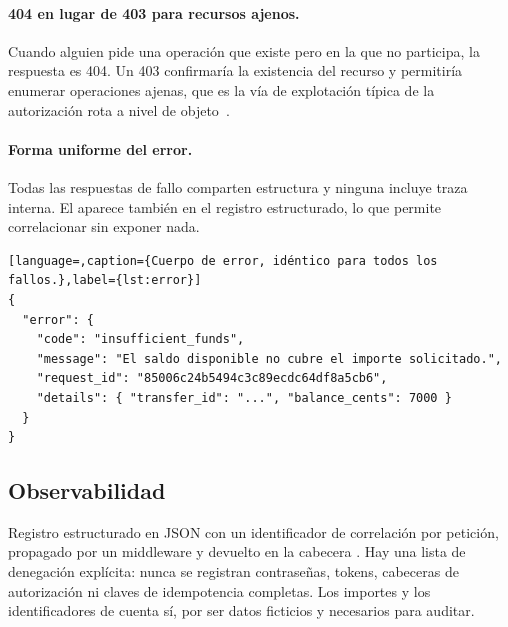 \paragraph{404 en lugar de 403 para recursos ajenos.} Cuando alguien pide una
operación que existe pero en la que no participa, la respuesta es 404. Un 403
confirmaría la existencia del recurso y permitiría enumerar operaciones
ajenas, que es la vía de explotación típica de la autorización rota a nivel
de objeto~\cite{owaspapi2023}.

\paragraph{Forma uniforme del error.} Todas las respuestas de fallo comparten
estructura y ninguna incluye traza interna. El  aparece
también en el registro estructurado, lo que permite correlacionar sin exponer
nada.

\begin{lstlisting}[language=,caption={Cuerpo de error, idéntico para todos los
fallos.},label={lst:error}]
{
  "error": {
    "code": "insufficient_funds",
    "message": "El saldo disponible no cubre el importe solicitado.",
    "request_id": "85006c24b5494c3c89ecdc64df8a5cb6",
    "details": { "transfer_id": "...", "balance_cents": 7000 }
  }
}
\end{lstlisting}

\subsection{Observabilidad}

Registro estructurado en JSON con un identificador de correlación por
petición, propagado por un middleware y devuelto en la cabecera
. Hay una lista de denegación explícita: nunca se
registran contraseñas, tokens, cabeceras de autorización ni claves de
idempotencia completas. Los importes y los identificadores de cuenta sí, por
ser datos ficticios y necesarios para auditar. 
